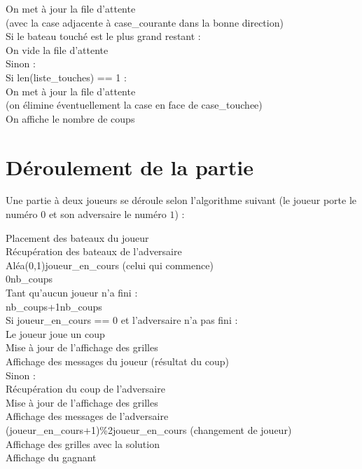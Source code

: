 \begin{algo1}
On met à jour la file d'attente\\
(avec la case adjacente à case\_courante dans la bonne direction)\\
Si le bateau touché est le plus grand restant :\\
On vide la file d'attente\\
Sinon :\\
Si len(liste\_touches) == 1 :\\
On met à jour la file d'attente\\
(on élimine éventuellement la case en face de case\_touchee)\\
On affiche le nombre de coups\\
\end{algo1}

\newpage
\section{Déroulement de la partie}\label{algo_partie}

Une partie à deux joueurs se déroule selon l'algorithme suivant (le joueur porte le numéro $0$ et son adversaire le numéro $1$) :

\begin{algo1}
Placement des bateaux du joueur\\
Récupération des bateaux de l'adversaire\\
Aléa(0,1)\sto joueur\_en\_cours (celui qui commence)\\
0\sto nb\_coups\\
Tant qu'aucun joueur n'a fini :\\
nb\_coups+1\sto nb\_coups\\
Si joueur\_en\_cours == 0 et l'adversaire n'a pas fini :\\
Le joueur joue un coup\\
Mise à jour de l'affichage des grilles\\
Affichage des messages du joueur (résultat du coup)\\
Sinon :\\
Récupération du coup de l'adversaire\\
Mise à jour de l'affichage des grilles\\
Affichage des messages de l'adversaire\\
(joueur\_en\_cours+1)\%2\sto joueur\_en\_cours (changement de joueur)\\
Affichage des grilles avec la solution\\
Affichage du gagnant\\
\end{algo1}

